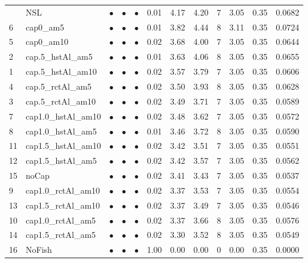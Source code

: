 \documentclass[11pt]{book}
\begin{document}
\begin{landscape}
\begin{longtable}[t]{llcccccccccc}
\midrule
\endhead
\
\endfoot
\bottomrule
\endlastfoot
17 & NSL & $\bullet$ & $\bullet$ & $\bullet$ & 0.01 & 4.17 & 4.20 & 7 & 3.05 & 0.35 & 0.0682\\
6 & cap0\_am5 & $\bullet$ & $\bullet$ & $\bullet$ & 0.01 & 3.82 & 4.44 & 8 & 3.11 & 0.35 & 0.0724\\
5 & cap0\_am10 & $\bullet$ & $\bullet$ & $\bullet$ & 0.02 & 3.68 & 4.00 & 7 & 3.05 & 0.35 & 0.0644\\
2 & cap.5\_hstAl\_am5 & $\bullet$ & $\bullet$ & $\bullet$ & 0.01 & 3.63 & 4.06 & 8 & 3.05 & 0.35 & 0.0655\\
1 & cap.5\_hstAl\_am10 & $\bullet$ & $\bullet$ & $\bullet$ & 0.02 & 3.57 & 3.79 & 7 & 3.05 & 0.35 & 0.0606\\
4 & cap.5\_rctAl\_am5 & $\bullet$ & $\bullet$ & $\bullet$ & 0.02 & 3.50 & 3.93 & 8 & 3.05 & 0.35 & 0.0628\\
3 & cap.5\_rctAl\_am10 & $\bullet$ & $\bullet$ & $\bullet$ & 0.02 & 3.49 & 3.71 & 7 & 3.05 & 0.35 & 0.0589\\
7 & cap1.0\_hstAl\_am10 & $\bullet$ & $\bullet$ & $\bullet$ & 0.02 & 3.48 & 3.62 & 7 & 3.05 & 0.35 & 0.0572\\
8 & cap1.0\_hstAl\_am5 & $\bullet$ & $\bullet$ & $\bullet$ & 0.01 & 3.46 & 3.72 & 8 & 3.05 & 0.35 & 0.0590\\
11 & cap1.5\_hstAl\_am10 & $\bullet$ & $\bullet$ & $\bullet$ & 0.02 & 3.42 & 3.51 & 7 & 3.05 & 0.35 & 0.0551\\
12 & cap1.5\_hstAl\_am5 & $\bullet$ & $\bullet$ & $\bullet$ & 0.02 & 3.42 & 3.57 & 7 & 3.05 & 0.35 & 0.0562\\
15 & noCap & $\bullet$ & $\bullet$ & $\bullet$ & 0.02 & 3.41 & 3.43 & 7 & 3.05 & 0.35 & 0.0537\\
9 & cap1.0\_rctAl\_am10 & $\bullet$ & $\bullet$ & $\bullet$ & 0.02 & 3.37 & 3.53 & 7 & 3.05 & 0.35 & 0.0554\\
13 & cap1.5\_rctAl\_am10 & $\bullet$ & $\bullet$ & $\bullet$ & 0.02 & 3.37 & 3.49 & 7 & 3.05 & 0.35 & 0.0546\\
10 & cap1.0\_rctAl\_am5 & $\bullet$ & $\bullet$ & $\bullet$ & 0.02 & 3.37 & 3.66 & 8 & 3.05 & 0.35 & 0.0576\\
14 & cap1.5\_rctAl\_am5 & $\bullet$ & $\bullet$ & $\bullet$ & 0.02 & 3.30 & 3.52 & 8 & 3.05 & 0.35 & 0.0549\\
16 & NoFish & $\bullet$ & $\bullet$ & $\bullet$ & 1.00 & 0.00 & 0.00 & 0 & 0.00 & 0.35 & 0.0000\\*
\end{longtable}
\end{landscape}
\endgroup{}
\end{document}
